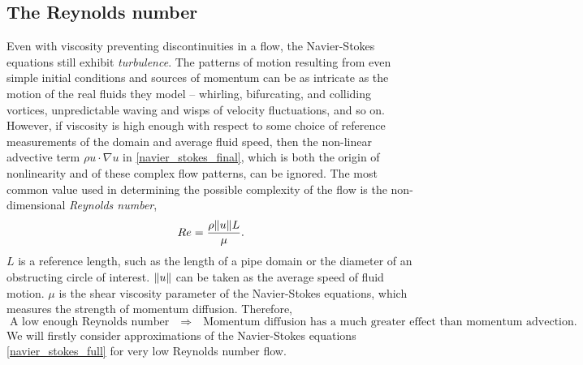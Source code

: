 \subsection{The Reynolds number}
Even with viscosity preventing discontinuities in a flow, the Navier-Stokes equations
still exhibit \textit{turbulence}. The patterns of motion resulting from even simple initial conditions and sources of momentum
can be as intricate as the motion of the real fluids they model -- whirling, bifurcating, and colliding vortices, unpredictable waving
and wisps of velocity fluctuations, and so on. However, if viscosity is high enough with respect
to some choice of reference measurements of the domain and average fluid speed, then the non-linear advective term $\rho u\cdot \nabla u$
in \eqref{navier_stokes_final}, which is both the origin of nonlinearity and of these complex flow patterns, can be ignored.
The most common value used in determining the possible complexity of the flow is the non-dimensional \textit{Reynolds number},
    $$Re = \frac{\rho \norm{u} L}{\mu}.$$
$L$ is a reference length, such as the length of a pipe domain or the diameter of an obstructing circle of interest. $\norm{u}$ can be
taken as the average speed of fluid motion. $\mu$ is the shear viscosity parameter of the Navier-Stokes equations,
which measures the strength of momentum diffusion. Therefore,
    $$\text{A low enough Reynolds number} \quad\Rightarrow\quad \text{Momentum diffusion has a much greater effect than momentum advection.}$$
We will firstly consider approximations of the Navier-Stokes equations \eqref{navier_stokes_full} for very low Reynolds number flow.

